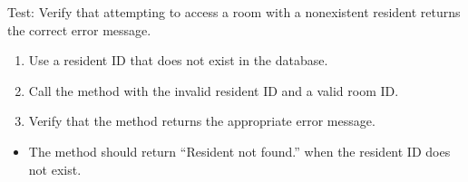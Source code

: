 \documentclass[letterpaper,10pt,english]{sphinxmanual}
\begin{document}
\begin{fulllineitems}
\label{\detokenize{test:test.test_room.test_access_room_resident_not_found}}
\pysigstartsignatures
\pysiglinewithargsret
{}
{}
{}
\pysigstopsignatures
\sphinxAtStartPar
Test: Verify that attempting to access a room with a non\sphinxhyphen{}existent resident returns the correct error message.
\begin{description}
\begin{enumerate}
%
\item {} 
\sphinxAtStartPar
Use a resident ID that does not exist in the database.

\item {} 
\sphinxAtStartPar
Call the  method with the invalid resident ID and a valid room ID.

\item {} 
\sphinxAtStartPar
Verify that the method returns the appropriate error message.

\end{enumerate}

\begin{itemize}
\item {} 
\sphinxAtStartPar
The method should return “Resident not found.” when the resident ID does not exist.

\end{itemize}

\end{description}

\end{fulllineitems}

\end{document}
